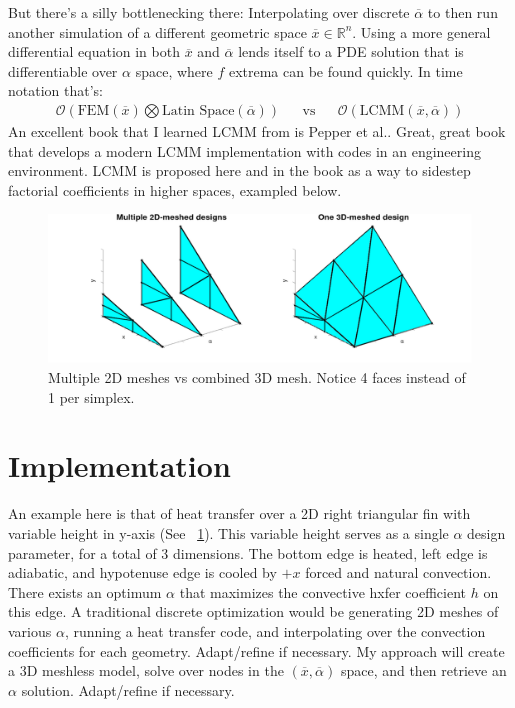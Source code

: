 \documentclass{article}
\begin{document}
But there's a silly bottlenecking there: Interpolating over discrete $\overline{\alpha}$ to then run another simulation of a different geometric space $\overline{x} \in \mathbb{R}^n$. Using a more general differential equation in both $\overline{x}$ and $\overline{\alpha}$ lends itself to a PDE solution that is differentiable over $\alpha$ space, where $f$ extrema can be found quickly. In time notation that's:\\
\begin{align*}
\mathcal{O}\left(\text{FEM}(\overline{x}) \bigotimes \text{Latin Space} (\overline{\alpha})\right) & & \text{vs} & & \mathcal{O}\left(\text{LCMM}(\overline{x},\overline{\alpha})\right)
\end{align*}
An excellent book that I learned LCMM from is Pepper et al.\cite{pepper_kassab_divo_2014}. Great, great book that develops a modern LCMM implementation with codes in an engineering environment. LCMM is proposed here and in the book as a way to sidestep factorial coefficients in higher spaces, exampled below.\\
\begin{figure}[H]
\begin{center}
\includegraphics[width=5in,center]{triangle meshes.png}
    \caption{Multiple 2D meshes vs combined 3D mesh. Notice 4 faces instead of 1 per simplex.}
\label{fig:foo}
\end{center}
\end{figure}
\section{Implementation}
An example here is that of heat transfer over a 2D right triangular fin with variable height in y-axis (See ~\ref{fig:foo}). This variable height serves as a single $\alpha$ design parameter, for a total of 3 dimensions. The bottom edge is heated, left edge is adiabatic, and hypotenuse edge is cooled by $+x$ forced and natural convection. There exists an optimum $\alpha$ that maximizes the convective hxfer coefficient $h$ on this edge. A traditional discrete optimization would be generating 2D meshes of various $\alpha$, running a heat transfer code, and interpolating over the convection coefficients for each geometry. Adapt/refine if necessary. My approach will create a 3D meshless model, solve over nodes in the $\left( \overline{x},\overline{\alpha}\right)$ space, and then retrieve an $\alpha$ solution. Adapt/refine if necessary.\\
\end{document}
